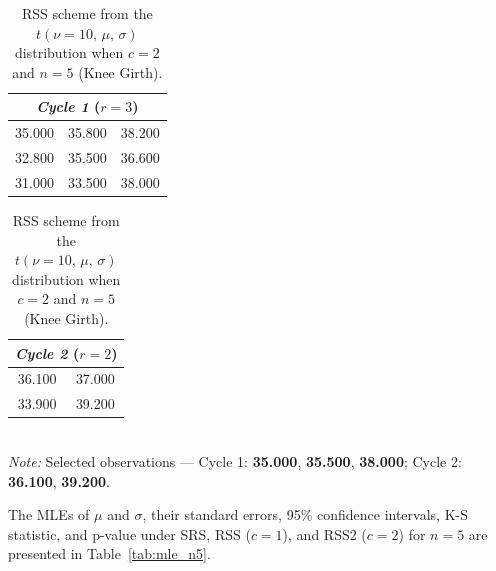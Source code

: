 \documentclass[12pt, a4paper]{article}
\begin{document}
\begin{table}[H]
  \centering
  \caption{RSS scheme from the $t(\nu=10,\,\mu,\,\sigma)$ distribution
           when $c = 2$ and $n = 5$ (Knee Girth).}
  \label{tab:rss2_n5}
  \begin{tabular}{ccc}
    \toprule
    \multicolumn{3}{c}{\textit{Cycle 1} ($r = 3$)} \\
    \midrule
    35.000 & 35.800 & 38.200 \\
    32.800 & 35.500 & 36.600 \\
    31.000 & 33.500 & 38.000 \\
    \bottomrule
  \end{tabular}
  \quad
  \begin{tabular}{cc}
    \toprule
    \multicolumn{2}{c}{\textit{Cycle 2} ($r = 2$)} \\
    \midrule
    36.100 & 37.000 \\
    33.900 & 39.200 \\
    \bottomrule
  \end{tabular}
  \smallskip\\
  \footnotesize
  \textit{Note:} Selected observations — Cycle 1:
  \textbf{35.000}, \textbf{35.500}, \textbf{38.000};
  Cycle 2: \textbf{36.100}, \textbf{39.200}.
\end{table}

The MLEs of $\mu$ and $\sigma$, their standard errors, 95\% confidence
intervals, K-S statistic, and p-value under SRS, RSS ($c=1$), and RSS2
($c=2$) for $n = 5$ are presented in Table~\ref{tab:mle_n5}.
\end{document}

